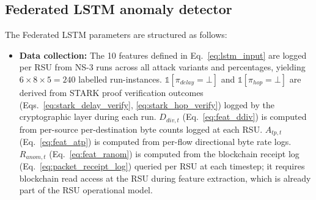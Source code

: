 \documentclass[12pt, a4paper]{report}
\begin{document}
{{\begin{itemize}
\end{itemize}

\subsection{Federated LSTM anomaly detector}
\label{sec:fed_lstm}
The Federated LSTM parameters are structured as follows:

\begin{itemize}
  \item \textbf{Data collection:}
The 10 features defined in
Eq.~\ref{eq:lstm_input} are logged per \ac{RSU}
from NS-3 runs across all attack variants and
percentages, yielding $6 \times 8 \times 5 = 240$
labelled run-instances.
$\mathbb{1}[\pi_{delay}{=}\bot]$ and
$\mathbb{1}[\pi_{hop}{=}\bot]$ are derived from
\ac{STARK} proof verification outcomes
(Eqs.~\ref{eq:stark_delay_verify},
\ref{eq:stark_hop_verify}) logged by the
cryptographic layer during each run.
$D_{div,t}$ (Eq.~\ref{eq:feat_ddiv}) is computed
from per-source per-destination byte counts logged
at each \ac{RSU}.
$A_{tp,t}$ (Eq.~\ref{eq:feat_atp}) is computed
from per-flow directional byte rate logs.
$R_{anom,t}$ (Eq.~\ref{eq:feat_ranom}) is computed
from the blockchain receipt log
(Eq.~\ref{eq:packet_receipt_log}) queried per
\ac{RSU} at each timestep; it requires blockchain
read access at the \ac{RSU} during feature
extraction, which is already part of the \ac{RSU}
operational model.


\end{itemize}}}
\end{document}

